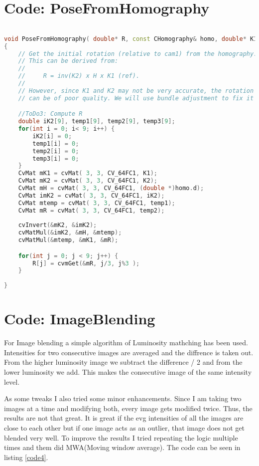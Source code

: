 \documentclass[11pt]{article}
\begin{document}
\section{Code: PoseFromHomography}
\begin{lstlisting}[language=C++, caption={PoseFromHomography()}, label=code3]

void PoseFromHomography( double* R, const CHomography& homo, double* K1, double* K2 )
{
    // Get the initial rotation (relative to cam1) from the homography. 
    // This can be derived from:
    //
    //     R = inv(K2) x H x K1 (ref).
    //
    // However, since K1 and K2 may not be very accurate, the rotation matrix 
    // can be of poor quality. We will use bundle adjustment to fix it later.

    //ToDo3: Compute R
    double iK2[9], temp1[9], temp2[9], temp3[9];
    for(int i = 0; i< 9; i++) {
        iK2[i] = 0;
        temp1[i] = 0;
        temp2[i] = 0;
        temp3[i] = 0;
    }
    CvMat mK1 = cvMat( 3, 3, CV_64FC1, K1);
    CvMat mK2 = cvMat( 3, 3, CV_64FC1, K2);
    CvMat mH = cvMat( 3, 3, CV_64FC1, (double *)homo.d);
    CvMat imK2 = cvMat( 3, 3, CV_64FC1, iK2);
    CvMat mtemp = cvMat( 3, 3, CV_64FC1, temp1);
    CvMat mR = cvMat( 3, 3, CV_64FC1, temp2); 
    
    cvInvert(&mK2, &imK2);
    cvMatMul(&imK2, &mH, &mtemp);
    cvMatMul(&mtemp, &mK1, &mR);

    for(int j = 0; j < 9; j++) {
        R[j] = cvmGet(&mR, j/3, j%3 );
    }
    
}

\end{lstlisting}
\section{Code: ImageBlending}
For Image blending a simple algorithm of Luminosity mathching has been used. Intensities for two consecutive images are averaged and the diffrence is taken out. From the higher luminosity image we subtract the difference / 2 and from the lower luminosity we add. This makes the consecutive image of the same intensity level.

As some tweaks I also tried some minor enhancements. Since I am taking two images at a time and modifying both, every image gets modified twice. Thus, the results are not that great. It is great if the evg intensities of all the images are close to each other but if one image acts as an outlier, that image does not get blended very well. To improve the results I tried repeating the logic multiple times and them did MWA(Moving window average). The code can be seen in listing \ref{code4}.
\end{document}
